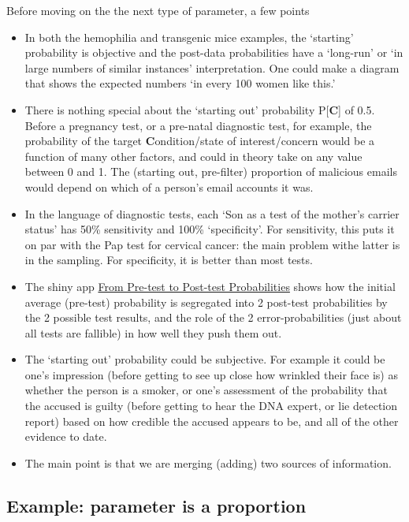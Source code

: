 \documentclass[]{book}
\begin{document}
Before moving on the the next type of parameter, a few points

\begin{itemize}
\item
  In both the hemophilia and transgenic mice examples, the `starting' probability is objective and the post-data
  probabilities have a `long-run' or `in large numbers of similar instances' interpretation. One could make a diagram that shows the expected numbers `in every 100 women like this.'
\item
  There is nothing special about the `starting out' probability P{[}\textbf{C}{]} of 0.5. Before a pregnancy test, or a pre-natal diagnostic test, for example, the probability of the target \textbf{C}ondition/state of interest/concern would be a function of many other factors, and could in theory take on any value between 0 and 1. The (starting out, pre-filter) proportion of malicious emails would depend on which of a person's email accounts it was.
\item
  In the language of diagnostic tests, each `Son as a test of the mother's carrier status' has 50\% sensitivity and 100\% `specificity'. For sensitivity, this puts it on par with the Pap test for cervical cancer: the main problem withe latter is in the sampling. For specificity, it is better than most tests.
\item
  The shiny app \href{https://jameshanley.shinyapps.io/FromPreTestToPostTestProbabilities/}{From Pre-test to Post-test Probabilities} shows how the initial average (pre-test) probability is segregated into 2 post-test probabilities by the 2 possible test results, and the role of the 2 error-probabilities (just about all tests are fallible) in how well they push them out.
\item
  The `starting out' probability could be subjective. For example it could be one's impression (before getting to see up close how wrinkled their face is) as whether the person is a smoker, or one's assessment of the probability that the accused is guilty (before getting to hear the DNA expert, or lie detection report) based on how credible the accused appears to be, and all of the other evidence to date.
\item
  The main point is that we are merging (adding) two sources of information.
\end{itemize}

\hypertarget{example-parameter-is-a-proportion}{%
\subsection{Example: parameter is a proportion}\label{example-parameter-is-a-proportion}}
\end{document}
